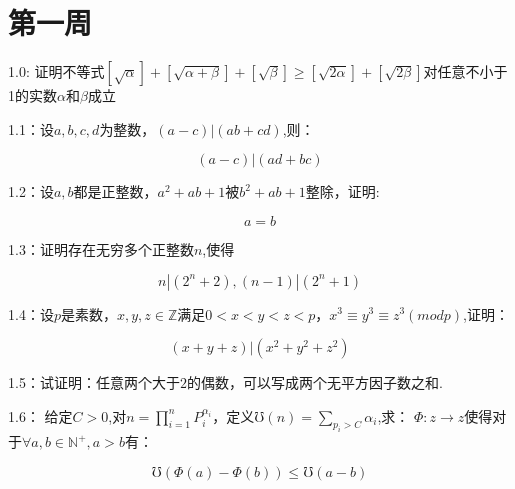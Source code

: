 \documentclass{ctexart}
\title{\LARGE\heiti {华罗庚协会讨论班题目}}
\author{华仔 }
\date{}
\begin{document}
\maketitle

\section{第一周}
1.0: 证明不等式$[\sqrt{\alpha}]+[\sqrt{\alpha+\beta}]+[\sqrt{\beta}]\ge [\sqrt{2 \alpha}]+[\sqrt{2\beta}]$对任意不小于1的实数$\alpha$和$\beta$成立

1.1：设$a,b,c,d$为整数，$(a-c)|(ab+cd)$,则：

	\[
	(a-c)|(ad+bc)
	\]

1.2：设$a,b$都是正整数，$a^2+ab+1$被$b^2+ab+1$整除，证明:

	\[
	a=b
	\]

1.3：证明存在无穷多个正整数$n$,使得
	
		\[
		n|(2^n+2),(n-1)|(2^n+1)
		\]

1.4：设$p$是素数，$x,y,z\in \mathbb{Z}$满足$0<x<y<z<p$，$x^3\equiv y^3\equiv z^3 (mod p)$,证明：
	
		\[
		(x+y+z)|(x^2+y^2+z^2)
		\]

1.5：试证明：任意两个大于$2$的偶数，可以写成两个无平方因子数之和.


1.6： 给定$C>0$,对$n=\displaystyle\prod_{i=1}^{n} P_{i}^{\alpha_{i}}$，定义$\mho(n)=\displaystyle\sum_{p_i>C} \alpha_{i}$,求：
$\Phi :z \rightarrow z$使得对于$\forall a,b\in \mathbb{N^{+}},a>b$有：

\[\mho (\Phi (a)-\Phi (b))\le \mho (a-b)\]
\end{document}
